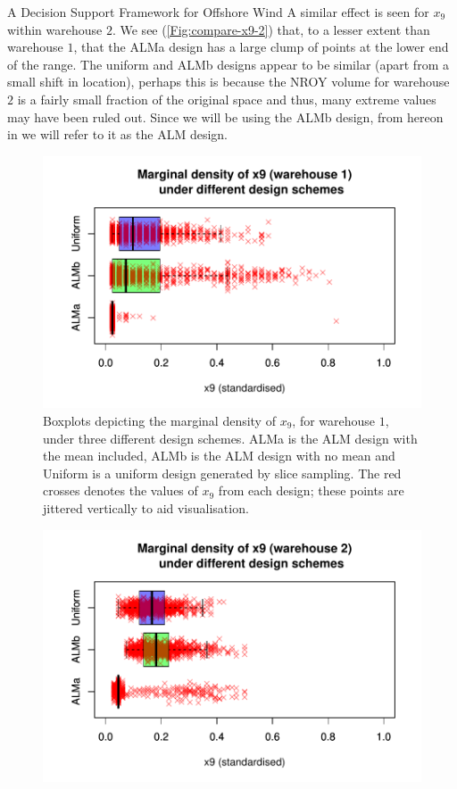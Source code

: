\begin{chapter}{A Decision Support Framework for Offshore Wind \label{Ch:ds-for-ow}}
A similar effect is seen for $x_9$ within warehouse $2$. We see (\cref{Fig:compare-x9-2}) that, to a lesser extent than warehouse $1$, that the ALMa design has a large clump of points at the lower end of the range. The uniform and ALMb designs appear to be similar (apart from a small shift in location), perhaps this is because the NROY volume for warehouse $2$ is a fairly small fraction of the original space and thus, many extreme values may have been ruled out. Since we will be using the ALMb design, from hereon in we will refer to it as the ALM design.
\begin{figure}
 \centering
 \includegraphics{fig-ds/compare-x9.pdf}
 \caption{Boxplots depicting the marginal density of $x_9$, for warehouse $1$, under three different design schemes. ALMa is the ALM design with the mean included, ALMb is the ALM design with no mean and Uniform is a uniform design generated by slice sampling. The red crosses denotes the values of $x_9$ from each design; these points are jittered vertically to aid visualisation. \label{Fig:compare-x9}}
\end{figure}
\begin{figure}
 \centering
 \includegraphics{fig-ds/compare-x9-w2.pdf}

\end{figure}
\end{chapter}
